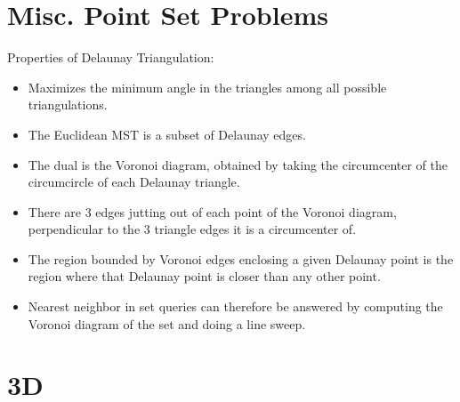 \section{Misc. Point Set Problems}
    Properties of Delaunay Triangulation:
    \begin{itemize}
        \item Maximizes the minimum angle in the triangles among all possible triangulations.
        \item The Euclidean MST is a subset of Delaunay edges.
        \item The dual is the Voronoi diagram, obtained by taking the circumcenter of the circumcircle of each Delaunay triangle.
        \item There are 3 edges jutting out of each point of the Voronoi diagram, perpendicular to the 3 triangle edges it is a circumcenter of.
        \item The region bounded by Voronoi edges enclosing a given Delaunay point is the region where that Delaunay point is closer than any other point.
        \item Nearest neighbor in set queries can therefore be answered by computing the Voronoi diagram of the set and doing a line sweep.
    \end{itemize}

\section{3D}
